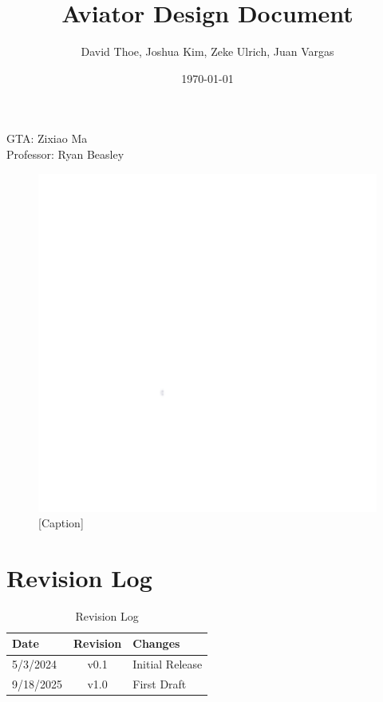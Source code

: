 \documentclass[letterpaper, 11pt]{article}
\begin{document}

\title{Aviator Design Document}
\author{David Thoe, Joshua Kim, Zeke Ulrich, Juan Vargas}
\date{\today}
\maketitle

\begin{center}
    GTA: Zixiao Ma \\
    Professor: Ryan Beasley
\end{center}

\begin{figure}[h]
    \centering
    \includegraphics[width=12cm,scale=1]{images/white.png}
    \caption{[Caption]}
\end{figure}

\clearpage
\tableofcontents

\clearpage
\listoffigures

\clearpage
\listoftables

\clearpage
\section*{Revision Log}
\begin{table}[h]
    \begin{tabularx}{\textwidth}{|l|c|X|} %
        \hline
        Date      & Revision & Changes         \\ \hline
        5/3/2024  & v0.1     & Initial Release \\ \hline
        9/18/2025 & v1.0     & First Draft     \\ \hline
    \end{tabularx}
    \caption{Revision Log}
\end{table}
\end{document}
